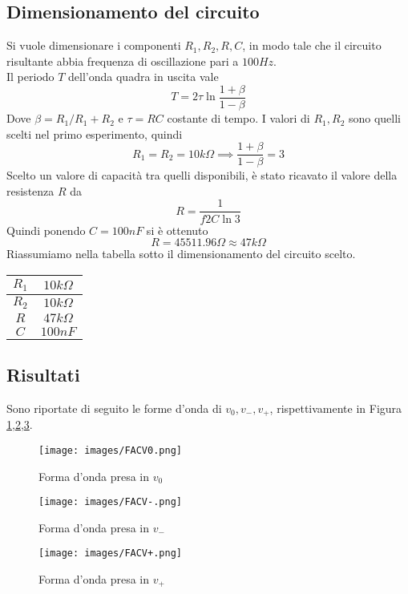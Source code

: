 \subsection{Dimensionamento del circuito}
Si vuole dimensionare i  componenti $R_1,R_2,R,C$, in modo tale che il circuito risultante abbia frequenza di oscillazione pari a $100Hz$.\\
Il periodo $T$ dell'onda quadra in uscita vale
\begin{equation}
    T=2\tau\ln{\frac{1+\beta}{1-\beta}}
\end{equation}
Dove $\beta=R_1/R_1+R_2$ e $\tau=RC$ costante di tempo. I valori di $R_1,R_2$ sono quelli scelti nel primo esperimento, quindi
\begin{equation*}
    R_1=R_2=10k\Omega\implies\frac{1+\beta}{1-\beta}=3
\end{equation*}
Scelto un valore di capacità tra quelli disponibili, è stato ricavato il valore della resistenza $R$ da
\begin{equation}
    R=\frac{1}{f2C\ln{3}}
\end{equation}
Quindi ponendo $C=100nF$ si è ottenuto
\begin{equation*}
    R = 45511.96\Omega \approx 47k\Omega
\end{equation*}
Riassumiamo nella tabella sotto il dimensionamento del circuito scelto.
\begin{table}[H]
    \centering
    \begin{tabular}{|c|c|}
        \hline
        $R_1$&$10k\Omega$\\\hline
        $R_2$&$10k\Omega$\\\hline
        $R$&$47k\Omega$\\\hline
        $C$&$100nF$\\\hline
    \end{tabular}
\end{table}
\subsection{Risultati}
Sono riportate di seguito le forme d'onda di $v_0,v_{-},v_{+}$, rispettivamente in Figura \ref{fig:FACV0},\ref{fig:FACV-},\ref{fig:FACV+}.
\begin{figure}[H]
    \centering
    \texttt{[image: images/FACV0.png]}
    \caption{Forma d'onda presa in $v_0$}
    \label{fig:FACV0}
\end{figure}
\begin{figure}[H]
    \centering
    \texttt{[image: images/FACV-.png]}
    \caption{Forma d'onda presa in $v_-$}
    \label{fig:FACV-}
\end{figure}
\begin{figure}[H]
    \centering
    \texttt{[image: images/FACV+.png]}
    \caption{Forma d'onda presa in $v_+$}
    \label{fig:FACV+}
\end{figure}
\clearpage
